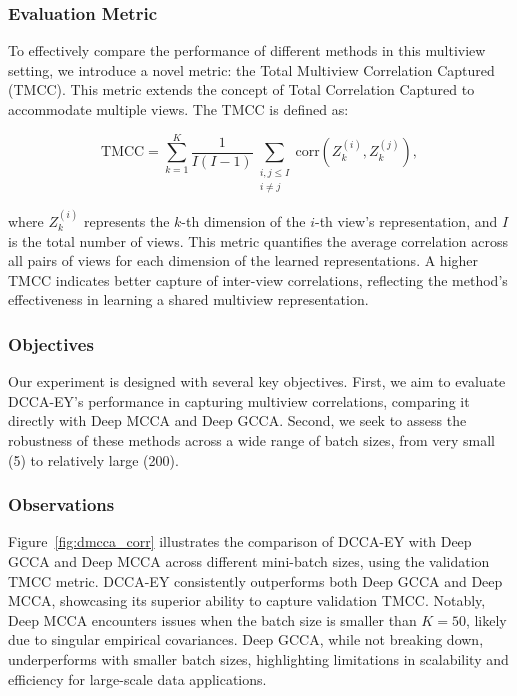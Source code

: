 \subsubsection{Evaluation Metric}

To effectively compare the performance of different methods in this multiview setting, we introduce a novel metric: the Total Multiview Correlation Captured (TMCC). This metric extends the concept of Total Correlation Captured to accommodate multiple views. The TMCC is defined as:

\[
    \text{TMCC} = \sum_{k=1}^{K} \frac{1}{I(I-1)} \sum_{\substack{i,j \leq I \\ i \neq j}} \text{corr}(Z_k^{(i)}, Z_k^{(j)}),
\]

where \( Z_k^{(i)} \) represents the \( k \)-th dimension of the \( i \)-th view's representation, and $I$ is the total number of views. This metric quantifies the average correlation across all pairs of views for each dimension of the learned representations. A higher TMCC indicates better capture of inter-view correlations, reflecting the method's effectiveness in learning a shared multiview representation.

\subsubsection{Objectives}

Our experiment is designed with several key objectives. First, we aim to evaluate DCCA-EY's performance in capturing multiview correlations, comparing it directly with Deep MCCA and Deep GCCA. Second, we seek to assess the robustness of these methods across a wide range of batch sizes, from very small (5) to relatively large (200).

\subsubsection{Observations}
Figure~\ref{fig:dmcca_corr} illustrates the comparison of DCCA-EY with Deep GCCA and Deep MCCA across different mini-batch sizes, using the validation TMCC metric.
DCCA-EY consistently outperforms both Deep GCCA and Deep MCCA, showcasing its superior ability to capture validation TMCC. Notably, Deep MCCA encounters issues when the batch size is smaller than $K=50$, likely due to singular empirical covariances.
Deep GCCA, while not breaking down, underperforms with smaller batch sizes, highlighting limitations in scalability and efficiency for large-scale data applications.


